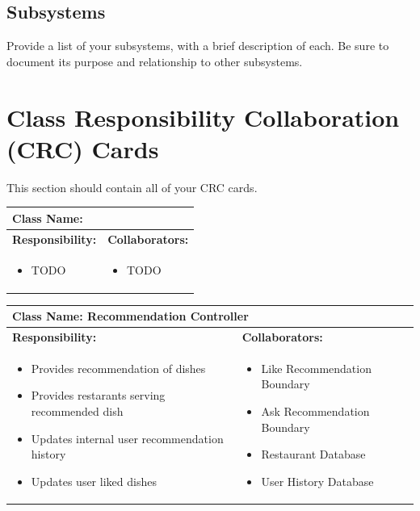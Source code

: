 \documentclass[]{article}
\begin{document}
\subsection{Subsystems}
\label{sub:subsystems}
 Provide a list of your subsystems, with a brief description of each. Be sure to document its purpose and relationship to other subsystems.


	
\section{Class Responsibility Collaboration (CRC) Cards}
\label{sec:class_responsibility_collaboration_crc_cards}
This section should contain all of your CRC cards.

\begin{table}[H]
	\centering
	\begin{tabular}{|p{7cm}|p{7cm}|}
	\hline 
	 \multicolumn{2}{|l|}{\textbf{Class Name:}} \\
	\hline
	\textbf{Responsibility:} & \textbf{Collaborators:} \\
	\hline
	\raggedright
	\begin{itemize}
		\item TODO
	\end{itemize}
	\vspace{1in} & 
	\begin{itemize}
		\item TODO
	\end{itemize} \\
	\hline
	\end{tabular}
\end{table}

\begin{table}[H]
	\centering
	\begin{tabular}{|p{7cm}|p{7cm}|}
	\hline 
	 \multicolumn{2}{|l|}{\textbf{Class Name: Recommendation Controller}} \\
	\hline
	\textbf{Responsibility:} & \textbf{Collaborators:} \\
	\hline
	\raggedright
	\begin{itemize}
		\item Provides recommendation of dishes
		\item  Provides restarants serving recommended dish
		\item Updates internal user recommendation history
		\item Updates user liked dishes
	\end{itemize}
	\vspace{1in} & 
	\begin{itemize}
		\item Like Recommendation Boundary
		\item Ask Recommendation Boundary
		\item Restaurant Database
		\item User History Database
	\end{itemize} \\
	\hline
	\end{tabular}
\end{table}
\end{document}

